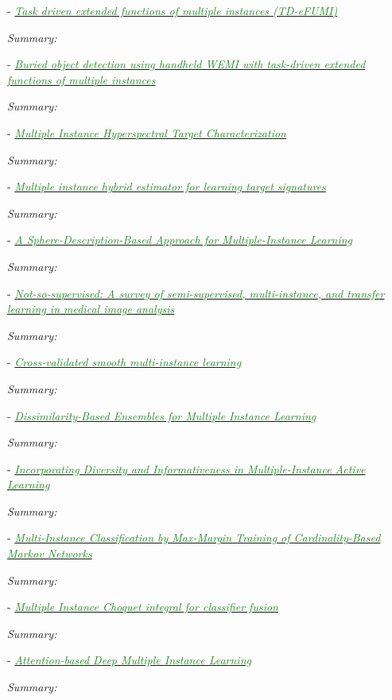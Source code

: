 \documentclass[]{article}
\newcommand{\paperentry}[4]{
            \hangindent=1cm
            \textcolor{red}{\cite{#1}} - \href{run:../References/#3}{\textcolor{ForestGreen}{\textit{#2}}}
            
            \noindent            
            \begin{minipage}[t]{0.1\linewidth}\hfill\end{minipage}
            \begin{minipage}[t]{0.8\linewidth}\textcolor{NavyBlue}{{\textit{Summary:}}}#4\end{minipage}
            \vspace{.25cm}
          }
\begin{document}
		\paperentry{Cook2015Thesis}
		{Task driven extended functions of multiple instances (TD-eFUMI)}
		{Multiple_Instance_Learning/Cook2015Thesis.pdf}
		{}
		
		\paperentry{Cook2016LandmineTaskDriveneFUMI}
		{Buried object detection using handheld WEMI with task-driven extended functions of multiple instances}
		{Multiple_Instance_Learning/Cook2016LandmineTaskDriveneFUMI.pdf}
		{}
		
		\paperentry{Zare2016MIACE}
		{Multiple Instance Hyperspectral Target Characterization}
		{Multiple_Instance_Learning/Zare2016MIACE.pdf}
		{}
		
		\paperentry{Jiao2017MIHE}
		{Multiple instance hybrid estimator for learning target signatures}
		{Multiple_Instance_Learning/Jiao2017MIHE.pdf}
		{}
		
		\paperentry{Xiao2017SphereMIL}
		{A Sphere-Description-Based Approach for Multiple-Instance Learning}
		{Multiple_Instance_Learning/Xiao2017SphereMIL.pdf}
		{}
		
		\paperentry{Cheplygina2019MILSurvey}
		{Not-so-supervised: A survey of semi-supervised, multi-instance, and transfer learning in medical image analysis}
		{Multiple_Instance_Learning/Cheplygina2019MILSurvey.pdf}
		{}
		
		\paperentry{Li2017SmoothMIL}
		{Cross-validated smooth multi-instance learning}
		{Multiple_Instance_Learning/Li2017SmoothMIL.pdf}
		{}
		
		\paperentry{Cheplygina2016DissimilarityEnsemblesMIL}
		{Dissimilarity-Based Ensembles for Multiple Instance Learning}
		{Multiple_Instance_Learning/Cheplygina2016DissimilarityEnsemblesMIL.pdf}
		{}
		
		\paperentry{Wang2017DiversityMILActiveLearning}
		{Incorporating Diversity and Informativeness in Multiple-Instance Active Learning}
		{Multiple_Instance_Learning/Wang2017DiversityMILActiveLearning.pdf}
		{}
		
		\paperentry{Hajimirsadeghi2017MIClassificationMarkovNetworks}
		{Multi-Instance Classification by Max-Margin Training of Cardinality-Based Markov Networks}
		{Multiple_Instance_Learning/Hajimirsadeghi2017MIClassificationMarkovNetworks.pdf}
		{}
		
		\paperentry{Du2016MIChoquetIntegralFusion}
		{Multiple Instance Choquet integral for classifier fusion}
		{Multiple_Instance_Learning/Du2016MIChoquetIntegralFusion.pdf}
		{}
		
		\paperentry{Ilse2018AttentionBasedDeepMIL}
		{Attention-based Deep Multiple Instance Learning}
		{Multiple_Instance_Learning/Ilse2018AttentionBasedDeepMIL.pdf}
		{}
		
\end{document}
